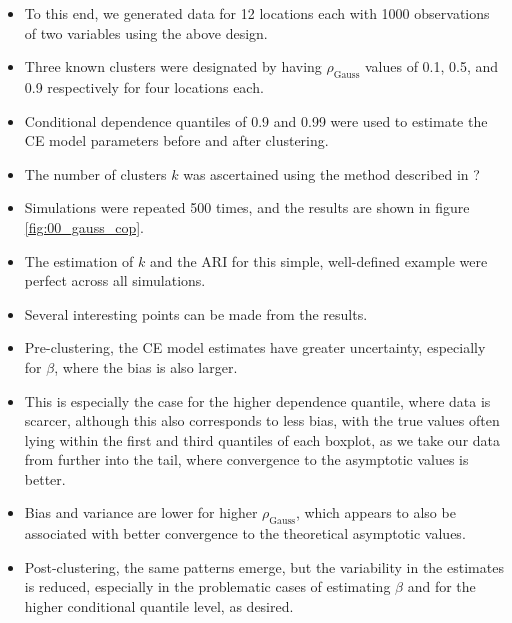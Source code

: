 \documentclass{article}
\numberwithin{equation}{section}
\begin{document}
\begin{itemize}
  \item To this end, we generated data for 12 locations each with 1000 observations of two variables using the above design.
  \item Three known clusters were designated by having $\rho_{\text{Gauss}}$ values of 0.1, 0.5, and 0.9 respectively for four locations each.
  \item Conditional dependence quantiles of 0.9 and 0.99 were used to estimate the CE model parameters before and after clustering. 
  \item The number of clusters $k$ was ascertained using the method described in ? 
  \item Simulations were repeated 500 times, and the results are shown in figure \ref{fig:00_gauss_cop}.
  \item The estimation of $k$ and the ARI for this simple, well-defined example were perfect across all simulations. 
  \item Several interesting points can be made from the results.
  \item Pre-clustering, the CE model estimates have greater uncertainty, especially for $\beta$, where the bias is also larger.
  \item This is especially the case for the higher dependence quantile, where data is scarcer, although this also corresponds to less bias, with the true values often lying within the first and third quantiles of each boxplot, as we take our data from further into the tail, where convergence to the asymptotic values is better.
  \item Bias and variance are lower for higher $\rho_{\text{Gauss}}$, which appears to also be associated with better convergence to the theoretical asymptotic values.
  \item Post-clustering, the same patterns emerge, but the variability in the estimates is reduced, especially in the problematic cases of estimating $\beta$ and for the higher conditional quantile level, as desired. 
\end{itemize}
\end{document}
